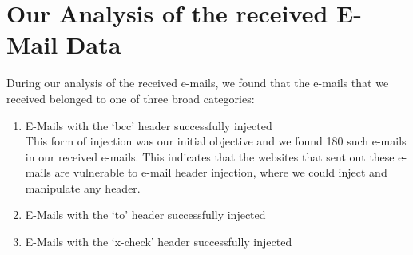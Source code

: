 \section[Analysis of Data]{Our Analysis of the received E-Mail Data}
During our analysis of the received e-mails, we found that the e-mails that we received belonged to one of three broad categories:
\begin{enumerate}
	\item E-Mails with the `bcc' header successfully injected\\
	This form of injection was our initial objective and we found 180 such e-mails in our received e-mails. This indicates that the websites that sent out these e-mails are vulnerable to e-mail header injection, where we could inject and manipulate any header.
	
	\item E-Mails with the `to' header successfully injected
	\item E-Mails with the `x-check' header successfully injected
\end{enumerate}

